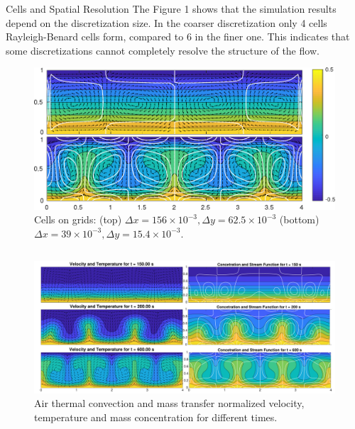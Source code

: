 \documentclass[final]{beamer}
\newlength{\onecolwid}
\newlength{\twocolwid}
\begin{document}
\begin{frame}[t]
\begin{columns}[t]
\begin{column}{\twocolwid}
\begin{columns}[t,totalwidth=\twocolwid]
\begin{column}{\onecolwid}
\begin{block}{Cells and Spatial Resolution}
	The Figure 1 shows that the simulation results depend on the discretization size. In the coarser discretization only 4 cells Rayleigh-Benard cells form, compared to 6 in the finer one. This indicates that some discretizations cannot completely resolve the structure of the flow.
	\vspace{1em}
\begin{figure}
\includegraphics[width=1.0\linewidth]{images/cells.pdf}
	\caption{\hspace{1em}Cells on grids: (top) $\Delta x=156\times10^{-3}, \Delta y=62.5\times10^{-3}$ (bottom) $\Delta x=39\times10^{-3}, \Delta y=15.4\times10^{-3}.$}
\end{figure}
\end{block}


\end{column} %

\end{columns} %

\vspace{-2em}
\begin{figure}
\includegraphics[width=1.0\linewidth]{images/figure1.pdf}
\caption{Air thermal convection and mass transfer normalized velocity, temperature and mass concentration for different times.}
\end{figure}


\end{column}
\end{columns}
\end{frame}
\end{document}
